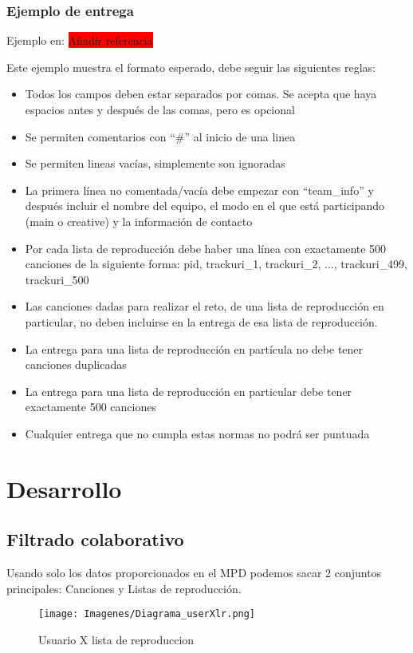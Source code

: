 \documentclass{article}
\begin{document}
	\subsubsection{Ejemplo de entrega}
	Ejemplo en: \colorbox{red}{Añadir referencia}

	Este ejemplo muestra el formato esperado, debe seguir las siguientes reglas:
	\begin{itemize}
		\item Todos los campos deben estar separados por comas. Se acepta que haya espacios antes y después de las comas, pero es opcional
		\item Se permiten comentarios con ``\#'' al inicio de una linea
		\item Se permiten lineas vacías, simplemente son ignoradas
		\item La primera línea no comentada/vacía debe empezar con ``team\_info'' y después incluir el nombre del equipo, el modo en el que está participando (main o creative) y  la información de contacto
		\item Por cada lista de reproducción debe haber una línea con exactamente 500 canciones de la siguiente forma: pid, trackuri\_1, trackuri\_2, ..., trackuri\_499, trackuri\_500
		\item Las canciones dadas para realizar el reto, de una lista de reproducción en particular, no deben incluirse en la entrega de esa lista de reproducción.
		\item La entrega para una lista de reproducción en partícula no debe tener canciones duplicadas
		\item La entrega para una lista de reproducción en particular debe tener exactamente 500 canciones
		\item Cualquier entrega que no cumpla estas normas no podrá ser puntuada 
	\end{itemize}

\newpage
\section{Desarrollo}
\subsection{Filtrado colaborativo}
Usando solo los datos proporcionados en el MPD podemos sacar 2 conjuntos principales: Canciones y Listas de reproducción.
\begin{figure}[h!]
	\texttt{[image: Imagenes/Diagrama\_userXlr.png]}
	\caption{Usuario X lista de reproduccion}
	\label{fig:userxlr1}
\end{figure}
\end{document}
